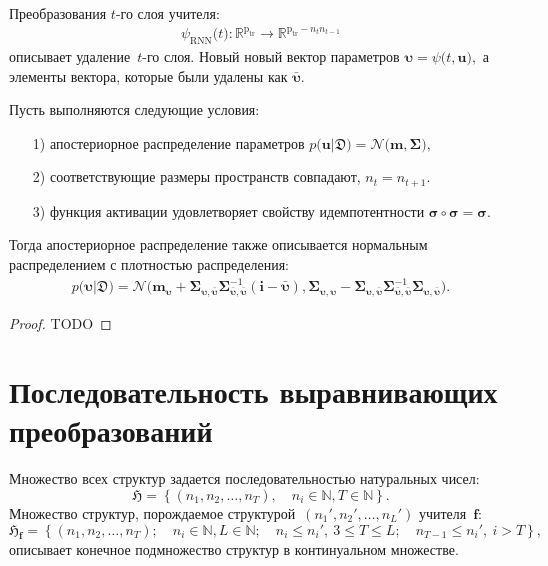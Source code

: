 Преобразования $t$-го слоя учителя:
\[
\begin{aligned}
\psi_{\text{RNN}}\bigr(t\bigr) : \mathbb{R}^{\text{p}_{\text{tr}}} \to \mathbb{R}^{\text{p}_{\text{tr}}-n_tn_{t-1}}
\end{aligned}
\]
описывает удаление~$t$-го слоя. Новый новый вектор параметров $\bm{\upsilon} = \psi\bigr(t, \mathbf{u}\bigr),$ а элементы вектора, которые были удалены как $\bar{\bm{\upsilon}}.$

\begin{theorem}
Пусть выполняются следующие условия:
\begin{enumerate}
\item[1)] апостериорное распределение параметров $p\bigr(\mathbf{u}|\mathfrak{D}\bigr) = \mathcal{N}\bigr(\mathbf{m}, \bm{\Sigma}\bigr),$
\item[2)] соответствующие размеры пространств совпадают, $n_t=n_{t+1}.$
\item[3)] функция активации удовлетворяет свойству идемпотентности $\bm{\sigma} \circ \bm{\sigma} = \bm{\sigma}$.
\end{enumerate}
Тогда апостериорное распределение также описывается нормальным распределением с плотностью распределения:
\[
\label{eq:ap:5}
\begin{aligned}
p\bigr(\bm{\upsilon}|\mathfrak{D}\bigr) = \mathcal{N}\bigr(\mathbf{m}_{\bm{\upsilon}}+\bm{\Sigma}_{\bm{\upsilon},\bar{\bm{\upsilon}}} \bm{\Sigma}_{\bar{\bm{\upsilon}},\bar{\bm{\upsilon}}}^{-1} \left(\mathbf{i} - \bar{\bm{\upsilon}}\right), \bm{\Sigma}_{\bm{\upsilon},\bm{\upsilon}} - \bm{\Sigma}_{\bm{\upsilon},\bar{\bm{\upsilon}}}\bm{\Sigma}_{\bar{\bm{\upsilon}},\bar{\bm{\upsilon}}}^{-1}\bm{\Sigma}_{\bm{\upsilon},\bar{\bm{\upsilon}}}\bigr).
\end{aligned}
\]
\end{theorem}
\begin{proof}
TODO
\end{proof}

\section{Последовательность выравнивающих преобразований}

Множество всех структур задается последовательностью натуральных чисел:
\[
\mathfrak{H} = \left\{(n_1, n_2, \ldots, n_{T}), \quad n_i \in \mathbb{N}, T \in \mathbb{N}\right\}.
\]
Множество структур, порождаемое структурой~$(n_{1}', n_{2}', \ldots, n_{L}')$ учителя~$\mathbf{f}$:
\[
\mathfrak{H}_{\mathbf{f}} = \left\{\left(n_1, n_2, \ldots, n_{T}\right); \quad n_i \in \mathbb{N}, L \in \mathbb{N}; \quad n_i \leq n_{i}',~3\leq T\leq L; \quad n_{T-1} \leq n_{i}',~i > T\right\},
\]
описывает конечное подмножество структур в континуальном множестве.


